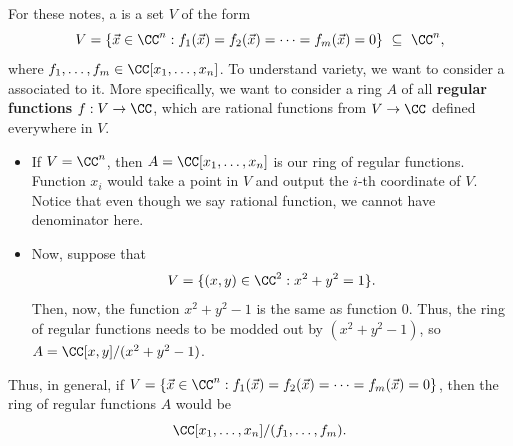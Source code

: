 For these notes, a  is a set $V$
of the form
$$V = \{\vec x\in\CC^n : 
f_1(\vec x) = f_2(\vec x) = \dots = f_m(\vec x)=0\}
\ \subseteq\ \CC^n,$$
where $f_1,\dots,f_m \in \CC[x_1,\dots,x_n]$.
To understand variety, we want to consider a  associated to it. 
More specifically, we want to consider a ring $A$ of 
all \textbf{regular functions} $f : V\to \CC$,
which are rational functions from $V\to\CC$
defined everywhere in $V$.
\begin{example}
    \begin{itemize}
    \item If $V=\CC^n$, then $A=\CC[x_1,\dots,x_n]$
    is our ring of regular functions. 
    Function $x_i$ would take a point in $V$ and output
    the $i$-th coordinate of $V$.
    Notice that even though we say
    rational function, we cannot have denominator here.
    \item Now, suppose that 
    $$V=\{(x,y)\in\CC^2 : x^2+y^2=1\}.$$
    Then, now, the function $x^2+y^2-1$ is the same as function $0$.
    Thus, the ring of regular functions 
    needs to be modded out by $(x^2+y^2-1)$,
    so $A = \CC[x,y] / (x^2+y^2-1)$.
    \end{itemize}
\end{example}
Thus, in general, if 
$V = \{\vec x\in\CC^n : 
f_1(\vec x) = f_2(\vec x) = \dots = f_m(\vec x)=0\}$,
then the ring of regular functions $A$ would be
$$\CC[x_1,\dots,x_n]/(f_1,\dots,f_m).$$


